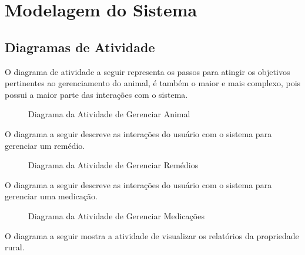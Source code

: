 \documentclass[12pt]{article}
\begin{document}
\newpage
\section{Modelagem do Sistema}

\subsection{Diagramas de Atividade}

O diagrama de atividade a seguir representa os passos para atingir os objetivos pertinentes ao gerenciamento do animal, é também o maior e mais complexo, pois possui a maior parte das interações com o sistema.

\begin{figure}[!h]
	\begin{center}
		\caption{Diagrama da Atividade de Gerenciar Animal}

	\end{center}
\end{figure}

\newpage

O diagrama a seguir descreve as interações do usuário com o sistema para gerenciar um remédio.

\begin{figure}[!h]
	\begin{center}
		\caption{Diagrama da Atividade de Gerenciar Remédios}

	\end{center}
\end{figure}

\newpage

O diagrama a seguir descreve as interações do usuário com o sistema para gerenciar uma medicação.

\begin{figure}[!h]
	\begin{center}
		\caption{Diagrama da Atividade de Gerenciar Medicações}

	\end{center}
\end{figure}

\newpage

O diagrama a seguir mostra a atividade de visualizar os relatórios da propriedade rural.
\end{document}
